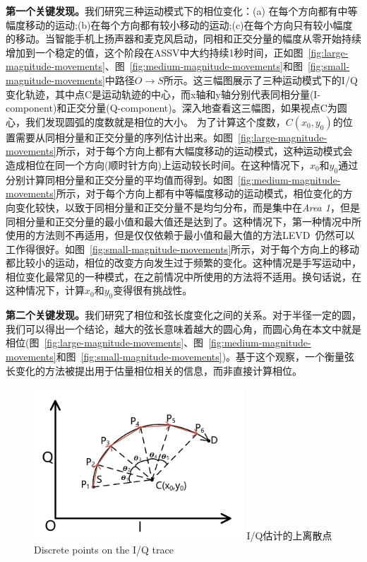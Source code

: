 \textbf{第一个关键发现。}我们研究三种运动模式下的相位变化：(a) 在每个方向都有中等幅度移动的运动;(b)在每个方向都有较小移动的运动;(c)在每个方向只有较小幅度的移动。当智能手机上扬声器和麦克风启动，同相和正交分量的幅度从零开始持续增加到一个稳定的值，这个阶段在ASSV中大约持续1秒时间，正如图~\ref{fig:large-magnitude-movements}、图~\ref{fig:medium-magnitude-movements}和图~\ref{fig:small-magnitude-movements}中路径$O\rightarrow S$所示。这三幅图展示了三种运动模式下的I/Q变化轨迹，其中点C是运动轨迹的中心，而x轴和y轴分别代表同相分量(I-component)和正交分量(Q-component)。深入地查看这三幅图，如果视点C为圆心，我们发现圆弧的度数就是相位的大小。 为了计算这个度数，$C(x_{0},y_{0})$的位置需要从同相分量和正交分量的序列估计出来。如图~\ref{fig:large-magnitude-movements}所示，对于每个方向上都有大幅度移动的运动模式，这种运动模式会造成相位在同一个方向(顺时针方向)上运动较长时间。在这种情况下，$x_0$和$y_0$通过分别计算同相分量和正交分量的平均值而得到。如图~\ref{fig:medium-magnitude-movements}所示，对于每个方向上都有中等幅度移动的运动模式，相位变化的方向变化较快，以致于同相分量和正交分量不是均匀分布，而是集中在\textit{Area 1}，但是同相分量和正交分量的最小值和最大值还是达到了。这种情况下，第一种情况中所使用的方法则不再适用，但是仅仅依赖于最小值和最大值的方法LEVD~\cite{wang2016device}仍然可以工作得很好。如图~\ref{fig:small-magnitude-movements}所示，对于每个方向上的移动都比较小的运动，相位的改变方向发生过于频繁的变化。这种情况是手写运动中，相位变化最常见的一种模式，在之前情况中所使用的方法将不适用。换句话说，在这种情况下，计算$x_{0}$和$y_{0}$变得很有挑战性。

\textbf{第二个关键发现。}我们研究了相位和弦长度变化之间的关系。对于半径一定的圆，我们可以得出一个结论，越大的弦长意味着越大的圆心角，而圆心角在本文中就是相位(图~\ref{fig:large-magnitude-movements}、图~\ref{fig:medium-magnitude-movements}和图~\ref{fig:small-magnitude-movements})。基于这个观察，一个衡量弦长变化的方法被提出用于估量相位相关的信息，而非直接计算相位。

\begin{figure}[!htp]
  \centering
  \includegraphics[width=0.7\textwidth]{figure/estimation-geometry.pdf}
  \bicaption
    {I/Q估计的上离散点}
    {Discrete points on the I/Q trace}
  \label{fig:discrete-point-trace}
\end{figure}

